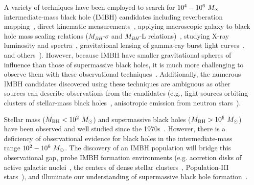 \documentclass[
 nofootinbib,
 amsmath,amssymb,
 aps,
 twocolumn,
 superscriptaddress
]{revtex4-2}
\newcommand{\mathcmd}[1]{{\sc \relax\ifmmode#1\else $#1$\fi}\xspace}
\newcommand{\msun}{\mathcmd{M_\odot}}
\begin{document}
A variety of techniques have been employed to search for ${10^{4} - 10^{6}~\msun}$ intermediate-mass black hole (IMBH) candidates including reverberation mapping~\cite{Peterson:2014:SSRv}, direct kinematic measurements~\cite{Schodel:2002:Natur, Kiziltan:2017:Natur}, applying macroscopic galaxy to black hole mass scaling relations ($M_{BH}$-$\sigma$ and $M_{BH}$-L relations)~\cite{Graham:2013:ApJ, Wevers:2017:MNRAS}, studying  X-ray luminosity and spectra~\cite{Greene:2004:ApJ, Lin:2020:ApJL}, gravitational lensing of gamma-ray burst light curves~\cite{paynter_evidence_2021}, and others~\cite{Greene:2020:ARA&A, Koliopanos:2017:mbhe, Mezcua:2017:IJMPD}). However, because IMBH have smaller gravitational spheres of influence than those of supermassive black holes, it is much more challenging to observe them with these observational techniques~\cite{Mezcua:2017:IJMPD}. Additionally, the numerous IMBH candidates discovered using these techniques are ambiguous as other sources can describe observations from the candidates (e.g., light sources orbiting clusters of stellar-mass black holes~\cite{Ridolfi:2016:MNRAS, Freire:2017:MNRAS}, anisotropic emission from neutron stars~\cite{Israel:2017:MNRAS, RodriguezCastillo:2020:ApJ}).

Stellar mass (${M_\text{BH} < 10^{2}~\msun}$) and supermassive black holes (${M_\text{BH} > 10^{6}~\msun}$) have been observed and well studied since the 1970s~\cite{Webster:1972:Natur, Balick:1974:ApJ, Ghez:1998:ApJ, Genzel:2010:RvMP, Abbott:2019:PhRvX, EventHorizonTelescopeCollaboration:2019:ApJL, Abbott:2020:arXiv}. However, there is a deficiency of observational evidence for black holes in the intermediate-mass range ${10^{2} - 10^{6}~\msun}$. The discovery of an IMBH population will bridge this observational gap, probe IMBH formation environments (e.g. accretion disks of active galactic nuclei~\cite{Tagawa:2021:ApJ, Li:2021:arXiv, Samsing:2020:arXiv, Tagawa:2020:ApJ, Ishibashi:2020:A&A, Grobner:2020:A&A, Yang:2019:PhRvL, McKernan:2019:ApJL, Yang:2019:ApJ, McKernan:2018:ApJ, Bellovary:2016:ApJL, McKernan:2014:MNRAS, McKernan:2012:MNRAS}, the centers of dense stellar clusters~\cite{Banerjee:2021:MNRASa, Zevin:2021:ApJ,Mapelli:2021:arXiv,Weatherford:2021:ApJL, Bouffanais:2021:arXiv, Ballone:2021:MNRAS, Kumamoto:2021:arXiv, Banerjee:2021:MNRASb, Martinez:2020:ApJ, Romero-Shaw:2020:ApJL, Anagnostou:2020:PASA}, Population-III stars~\cite{Toubiana:2021:PhRvL, Farrell:2021:MNRAS, Safarzadeh:2020:ApJL, Liu:2020:MNRAS, Inayoshi:2017:MNRAS}), and illuminate our understanding of supermassive black hole formation~\cite{Askar:2021:MNRAS, ArcaSedda:2019:arXiv, Amaro-Seoane:2007:CQGra, Gurkan:2006:ApJL}. 
\end{document}
